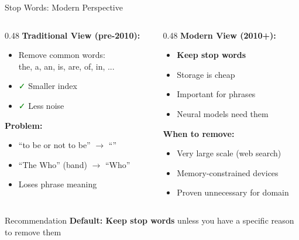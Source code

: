 \documentclass[aspectratio=169]{beamer}
\newif\ifanimated
\newcommand{\cpause}{\ifanimated\pause\fi}
\begin{document}
\begin{frame}[shrink=10]{Stop Words: Modern Perspective}
\begin{columns}
\begin{column}{0.48\textwidth}
\textbf{Traditional View (pre-2010):}
\begin{itemize}
    \item Remove common words: \\
    the, a, an, is, are, of, in, ...
    \item \textcolor{green}{\faCheck } Smaller index
    \item \textcolor{green}{\faCheck } Less noise
\end{itemize}

\vspace{1em}

\textbf{Problem:}
\begin{itemize}
    \item ``to be or not to be'' $\rightarrow$ ``''
    \item ``The Who'' (band) $\rightarrow$ ``Who''
    \item Loses phrase meaning
\end{itemize}
\end{column}

\begin{column}{0.48\textwidth}
\textbf{Modern View (2010+):}
\begin{itemize}
    \item \textbf{Keep stop words}
    \item Storage is cheap
    \item Important for phrases
    \item Neural models need them
\end{itemize}

\vspace{1em}

\textbf{When to remove:}
\begin{itemize}
    \item Very large scale (web search)
    \item Memory-constrained devices
    \item Proven unnecessary for domain
\end{itemize}
\end{column}
\end{columns}

\vspace{1em}

\begin{block}{Recommendation}
\textbf{Default: Keep stop words} unless you have a specific reason to remove them
\end{block}
\cpause
\end{frame}
\end{document}
